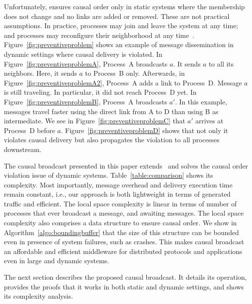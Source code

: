Unfortunately, \cite{friedman2004causal} ensures causal order only in static
systems where the membership does not change and no links are added or
removed. These are not practical assumptions.  In practice, processes may join
and leave the system at any time; and processes may reconfigure their
neighborhood at any time~\cite{nedelec2016crate}.
Figure~\ref{fig:preventiveproblem} shows an example of message dissemination in
dynamic settings where causal delivery is violated. In
Figure~\ref{fig:preventiveproblemA}, Process~A broadcasts $a$. It sends $a$ to
all its neighbors. Here, it sends $a$ to Process~B only.  Afterwards, in
Figure~\ref{fig:preventiveproblemA2}, Process~A adds a link to
Process~D. Message $a$ is still traveling. In particular, it did not reach
Process~D yet. In Figure~\ref{fig:preventiveproblemB}, Process~A broadcasts
$a'$. In this example, messages travel faster using the direct link from A to D
than using B as intermediate.  We see in Figure~\ref{fig:preventiveproblemC}
that $a'$ arrives at Process~D before $a$. Figure~\ref{fig:preventiveproblemD}
shows that not only it violates causal delivery but also propagates the
violation to all processes downstream.

The causal broadcast presented in this paper extends~\cite{friedman2004causal}
and solves the causal order violation issue of dynamic systems.
Table~\ref{table:comparison} shows its complexity. Most importantly, message
overhead and delivery execution time remain constant, i.e., our approach is both
lightweight in terms of generated traffic and efficient. The local space
complexity is linear in terms of number of processes that ever broadcast a
message, and awaiting messages.  The local space complexity also comprises a
data structure to ensure causal order. We show in
Algorithm~\ref{algo:boundingbuffer} that the size of this structure can be
bounded even in presence of system failures, such as crashes.  This makes causal
broadcast an affordable and efficient middleware for distributed protocols and
applications even in large and dynamic systems.

The next section describes the proposed causal broadcast. It details its
operation, provides the proofs that it works in both static and dynamic
settings, and shows its complexity analysis.

